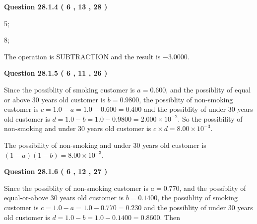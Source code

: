 \documentclass[12pt]{article}
\begin{document}
 
 
  
\vspace{0.2in}
  
{\textbf{\Large{Question
28.1.4 
 (           6 ,          13 ,          28 )
}}}
  
  
 
 
\noindent{}

5;
 
8;
 
The operation is  %
SUBTRACTION and the result is
$ %
-3.0000$.
 
 
 
  
\vspace{0.2in}
  
{\textbf{\Large{Question
28.1.5 
 (           6 ,          11 ,          26 )
}}}
  
  
 
 
\noindent{}

Since the possiblity of  %
smoking customer is $ a =  %
0.600 $,
and the possiblity of  %
equal or above 30 years old customer is $ b =  %
0.9800 $,
the possiblity of  %
non-smoking customer is $ c = 1.0 - a = 1.0 -
0.600
=  %
0.400 $ and the possiblity of  %
under 30 years old
customer is $ d = 1.0 - b = 1.0 -  %
0.9800 =  %
2.000 \times 10^{-2}  $.
So the possibility of  %
 non-smoking and  %
under 30 years old
customer is $ c \times d =  %
8.00 \times 10^{-3} $.
 
 
 
 
 
\noindent{}

The possibility of  %
 non-smoking and  %
under 30 years old
customer is $ (1-a)(1-b) =  %
8.00 \times 10^{-3} $.
 
 
  
\vspace{0.2in}
  
{\textbf{\Large{Question
28.1.6 
 (           6 ,          12 ,          27 )
}}}
  
  
 
 
\noindent{}

Since the possiblity of  %
 non-smoking customer is $ a =  %
0.770 $,
and the possiblity of  %
equal-or-above 30 years old customer is $ b =  %
0.1400 $,
the possiblity of  %
smoking customer is $ c = 1.0 - a = 1.0 -
0.770
=  %
0.230 $ and the possiblity of  %
under 30 years old
customer is $ d = 1.0 - b = 1.0 -  %
0.1400 =  %
0.8600  $.
Then
 
\end{document}
